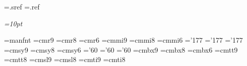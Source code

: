

\xdef\fmtversion{\fmtversion+TWIMAC}

\newif\ifsorted
\newread\sreffile \openin\sreffile=\jobname.sref
\newwrite{}
\ifeof\sreffile \immediate\openout{}=\jobname.ref \sortedfalse
\else \sortedtrue {} \fi

\newdimen\em \em=10pt
\parskip 0pt %
\em %

\font\manual=manfnt
\font\ninerm=cmr9
\font\eightrm=cmr8
\font\sixrm=cmr6
\font\ninei=cmmi9
\font\eighti=cmmi8
\font\sixi=cmmi6
\skewchar\ninei='177 \skewchar\eighti='177 \skewchar\sixi='177
\font\ninesy=cmsy9
\font\eightsy=cmsy8
\font\sixsy=cmsy6
\skewchar\ninesy='60 \skewchar\eightsy='60 \skewchar\sixsy='60
\font\ninebf=cmbx9
\font\eightbf=cmbx8
\font\sixbf=cmbx6
\font\ninett=cmtt9
\font\eighttt=cmtt8
\hyphenchar{} \hyphenchar{}
\font\ninesl=cmsl9
\font\eightsl=cmsl8
\font\nineit=cmti9
\font\eightit=cmti8

\newif\iftenpoint
\def\tenpoint{\tenpointtrue
 \def\rm{\fam0\tenrm}%
  \textfont0=\tenrm \scriptfont0=\sevenrm \scriptscriptfont0=\fiverm
  \textfont1=\teni \scriptfont1=\seveni \scriptscriptfont1=\fivei
  \textfont2=\tensy \scriptfont2=\sevensy \scriptscriptfont2=\fivesy
  \textfont3=\tenex \scriptfont3=\tenex \scriptscriptfont3=\tenex
  \def\it{\fam\itfam\tenit}%
  \textfont\itfam=\tenit
  \def\sl{\fam\slfam\tensl}%
  \textfont\slfam=\tensl
  \def\bf{\fam\bffam\tenbf}%
  \textfont\bffam=\tenbf \scriptfont\bffam=\sevenbf
   \scriptscriptfont\bffam=\fivebf
  \def\tt{\fam\ttfam\tentt}%
  \textfont\ttfam=\tentt
  \def\ttx{\tentex}%
  \normalbaselineskip=12pt
  \def\MF{{\manual META}\-{\manual FONT}}%
  \let\sc=\eightrm
  \let\big=\tenbig
  \setbox\strutbox=\hbox{\vrule height8pt depth3pt width 0pt}%
  \normalbaselines\rm}

\def\ninepoint{\tenpointfalse
 \def\rm{\fam0\ninerm}%
  \textfont0=\ninerm \scriptfont0=\sixrm \scriptscriptfont0=\fiverm
  \textfont1=\ninei \scriptfont1=\sixi \scriptscriptfont1=\fivei
  \textfont2=\ninesy \scriptfont2=\sixsy \scriptscriptfont2=\fivesy
  \textfont3=\tenex \scriptfont3=\tenex \scriptscriptfont3=\tenex
  \def\it{\fam\itfam\nineit}%
  \textfont\itfam=\nineit
  \def\sl{\fam\slfam\ninesl}%
  \textfont\slfam=\ninesl
  \def\bf{\fam\bffam\ninebf}%
  \textfont\bffam=\ninebf \scriptfont\bffam=\sixbf
   \scriptscriptfont\bffam=\fivebf
  \def\tt{\fam\ttfam\ninett}%
  \textfont\ttfam=\ninett
  \def\ttx{\ninetex}%
  \normalbaselineskip=11pt
  \def\MF{{\manual hijk}\-{\manual lmnj}}%
  \let\sc=\sevenrm
  \let\big=\ninebig
  \setbox\strutbox=\hbox{\vrule height8pt depth3pt width 0pt}%
  \normalbaselines\rm}

